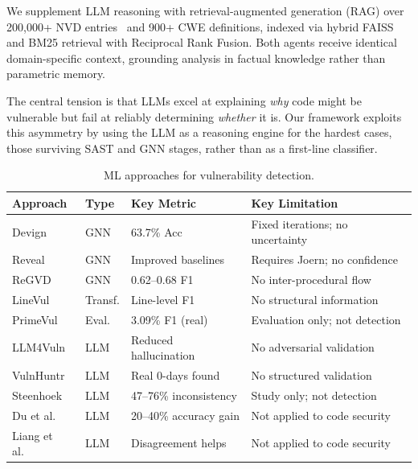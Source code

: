 We supplement LLM reasoning with retrieval-augmented generation (RAG)
over 200,000+ NVD entries~\cite{nvd2023} and 900+ CWE definitions,
indexed via hybrid FAISS and BM25 retrieval with Reciprocal Rank Fusion.
Both agents receive identical domain-specific context, grounding analysis
in factual knowledge rather than parametric memory.

The central tension is that LLMs excel at explaining \emph{why} code
might be vulnerable but fail at reliably determining \emph{whether} it
is. Our framework exploits this asymmetry by using the LLM as a
reasoning engine for the hardest cases, those surviving SAST and GNN
stages, rather than as a first-line classifier.

\begin{table}[H]
\centering
\caption{ML approaches for vulnerability detection.}
\label{tab:ml-lit}
\small
\renewcommand{\arraystretch}{1.15}
\begin{tabular}{p{2.0cm} p{1.5cm} p{2.5cm} p{4.0cm}}
\toprule
\textbf{Approach} & \textbf{Type} & \textbf{Key Metric} & \textbf{Key Limitation} \\
\midrule
Devign \cite{devign2019}          & GNN   & 63.7\% Acc             & Fixed iterations; no uncertainty \\
Reveal \cite{reveal2021}          & GNN   & Improved baselines      & Requires Joern; no confidence \\
ReGVD \cite{regvd2022}            & GNN   & 0.62--0.68 F1          & No inter-procedural flow \\
LineVul \cite{linevul2022}        & Transf. & Line-level F1        & No structural information \\
PrimeVul \cite{primevul2024}      & Eval. & 3.09\% F1 (real)       & Evaluation only; not detection \\
LLM4Vuln \cite{llm4vuln2024}     & LLM   & Reduced hallucination  & No adversarial validation \\
VulnHuntr \cite{vulnhuntr2024}   & LLM   & Real 0-days found      & No structured validation \\
Steenhoek \cite{steenhoek2024}   & LLM   & 47--76\% inconsistency & Study only; not detection \\
Du et al.\ \cite{multiagentdebate2023}  & LLM   & 20--40\% accuracy gain & Not applied to code security \\
Liang et al.\ \cite{divergentthinking2023} & LLM & Disagreement helps & Not applied to code security \\
\bottomrule
\end{tabular}
\end{table}

